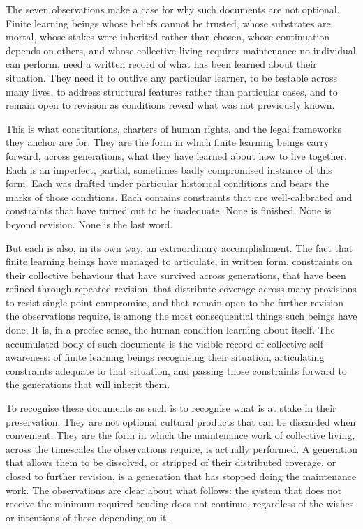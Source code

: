 \documentclass[11pt]{article}
\begin{document}
The seven observations make a case for why such documents are
not optional. Finite learning beings whose beliefs cannot be
trusted, whose substrates are mortal, whose stakes were
inherited rather than chosen, whose continuation depends on
others, and whose collective living requires maintenance no
individual can perform, need a written record of what has been
learned about their situation. They need it to outlive any
particular learner, to be testable across many lives, to address
structural features rather than particular cases, and to remain
open to revision as conditions reveal what was not previously
known.

This is what constitutions, charters of human rights, and the
legal frameworks they anchor are for. They are the form in which
finite learning beings carry forward, across generations, what
they have learned about how to live together. Each is an
imperfect, partial, sometimes badly compromised instance of this
form. Each was drafted under particular historical conditions
and bears the marks of those conditions. Each contains
constraints that are well-calibrated and constraints that have
turned out to be inadequate. None is finished. None is beyond
revision. None is the last word.

But each is also, in its own way, an extraordinary
accomplishment. The fact that finite learning beings have
managed to articulate, in written form, constraints on their
collective behaviour that have survived across generations, that
have been refined through repeated revision, that distribute
coverage across many provisions to resist single-point
compromise, and that remain open to the further revision the
observations require, is among the most consequential things
such beings have done. It is, in a precise sense, the human
condition learning about itself. The accumulated body of such
documents is the visible record of collective self-awareness:
of finite learning beings recognising their situation,
articulating constraints adequate to that situation, and passing
those constraints forward to the generations that will inherit
them.

To recognise these documents as such is to recognise what is at
stake in their preservation. They are not optional cultural
products that can be discarded when convenient. They are the
form in which the maintenance work of collective living, across
the timescales the observations require, is actually performed.
A generation that allows them to be dissolved, or stripped of
their distributed coverage, or closed to further revision, is a
generation that has stopped doing the maintenance work. The
observations are clear about what follows: the system that does
not receive the minimum required tending does not continue,
regardless of the wishes or intentions of those depending on
it.
\end{document}
